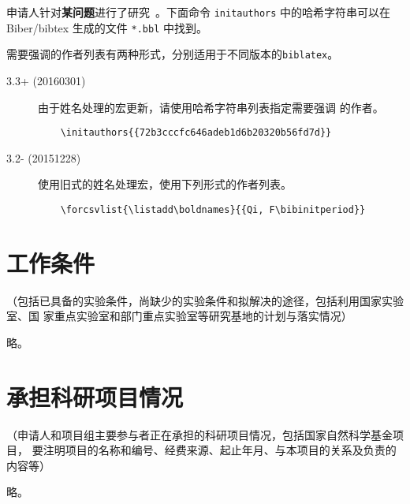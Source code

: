 \documentclass[subfig,boldtoc]{mynsfc}
\begin{document}
\begin{refsection}

  申请人针对\textbf{某问题}进行了研究~\cite{xia_saliency_2015}。下面命令
  \texttt{initauthors} 中的哈希字符串可以在Biber/bibtex 生成的文件
  \texttt{*.bbl} 中找到。

  需要强调的作者列表有两种形式，分别适用于不同版本的\texttt{biblatex}。
  \begin{description}
  \item[3.3+ (20160301)] 由于姓名处理的宏更新，请使用哈希字符串列表指定需要强调
    的作者。
\begin{verbatim}
    \initauthors{{72b3cccfc646adeb1d6b20320b56fd7d}}
\end{verbatim}
  \item[3.2- (20151228)] 使用旧式的姓名处理宏，使用下列形式的作者列表。
\begin{verbatim}
    \forcsvlist{\listadd\boldnames}{{Qi, F\bibinitperiod}}
\end{verbatim}
  \end{description}


  \printbibliography[prefixnumbers=J,heading=cvtype,title={相关工作}]

\end{refsection}

\section{工作条件}
\label{sec:devices-laboratory}

\begin{hcomment}
  （包括已具备的实验条件，尚缺少的实验条件和拟解决的途径，包括利用国家实验室、国
  家重点实验室和部门重点实验室等研究基地的计划与落实情况）
\end{hcomment}

略。

\section{承担科研项目情况}
\label{sec:projects}

\begin{hcomment}
  （申请人和项目组主要参与者正在承担的科研项目情况，包括国家自然科学基金项目，
  要注明项目的名称和编号、经费来源、起止年月、与本项目的关系及负责的内容等）
\end{hcomment}

略。
\end{document}
